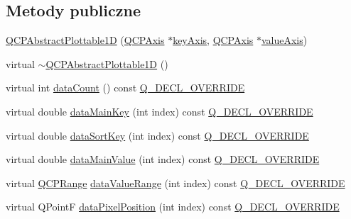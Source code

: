 \subsection*{Metody publiczne}
\begin{DoxyCompactItemize}
\item 
\hyperlink{class_q_c_p_abstract_plottable1_d_a30b2e50ab0afce65f104ea7a95440315}{Q\+C\+P\+Abstract\+Plottable1D} (\hyperlink{class_q_c_p_axis}{Q\+C\+P\+Axis} $\ast$\hyperlink{class_q_c_p_abstract_plottable_a72c7a09c22963f2c943f07112b311103}{key\+Axis}, \hyperlink{class_q_c_p_axis}{Q\+C\+P\+Axis} $\ast$\hyperlink{class_q_c_p_abstract_plottable_a3106f9d34d330a6097a8ec5905e5b519}{value\+Axis})
\item 
virtual \hyperlink{class_q_c_p_abstract_plottable1_d_afa6d5d2c971fed63bff4f4a79989a3f8}{$\sim$\+Q\+C\+P\+Abstract\+Plottable1D} ()
\item 
virtual int \hyperlink{class_q_c_p_abstract_plottable1_d_ab5dd99e4f1621e7dbd63438e0b02984e}{data\+Count} () const \hyperlink{qcustomplot_8hh_a42cc5eaeb25b85f8b52d2a4b94c56f55}{Q\+\_\+\+D\+E\+C\+L\+\_\+\+O\+V\+E\+R\+R\+I\+DE}
\item 
virtual double \hyperlink{class_q_c_p_abstract_plottable1_d_aeb156ebf5d3c8de906b428be30733ad8}{data\+Main\+Key} (int index) const \hyperlink{qcustomplot_8hh_a42cc5eaeb25b85f8b52d2a4b94c56f55}{Q\+\_\+\+D\+E\+C\+L\+\_\+\+O\+V\+E\+R\+R\+I\+DE}
\item 
virtual double \hyperlink{class_q_c_p_abstract_plottable1_d_aa8277da921b009bce474437d50b4a2d8}{data\+Sort\+Key} (int index) const \hyperlink{qcustomplot_8hh_a42cc5eaeb25b85f8b52d2a4b94c56f55}{Q\+\_\+\+D\+E\+C\+L\+\_\+\+O\+V\+E\+R\+R\+I\+DE}
\item 
virtual double \hyperlink{class_q_c_p_abstract_plottable1_d_a6be0f657ba85a1688336d76ad649ecf2}{data\+Main\+Value} (int index) const \hyperlink{qcustomplot_8hh_a42cc5eaeb25b85f8b52d2a4b94c56f55}{Q\+\_\+\+D\+E\+C\+L\+\_\+\+O\+V\+E\+R\+R\+I\+DE}
\item 
virtual \hyperlink{class_q_c_p_range}{Q\+C\+P\+Range} \hyperlink{class_q_c_p_abstract_plottable1_d_a55f937ba6a63e56e57f0b1a6e85a333a}{data\+Value\+Range} (int index) const \hyperlink{qcustomplot_8hh_a42cc5eaeb25b85f8b52d2a4b94c56f55}{Q\+\_\+\+D\+E\+C\+L\+\_\+\+O\+V\+E\+R\+R\+I\+DE}
\item 
virtual Q\+PointF \hyperlink{class_q_c_p_abstract_plottable1_d_a6ca0699a6af5f25a7565de7c50ce13b2}{data\+Pixel\+Position} (int index) const \hyperlink{qcustomplot_8hh_a42cc5eaeb25b85f8b52d2a4b94c56f55}{Q\+\_\+\+D\+E\+C\+L\+\_\+\+O\+V\+E\+R\+R\+I\+DE}

\end{DoxyCompactItemize}

